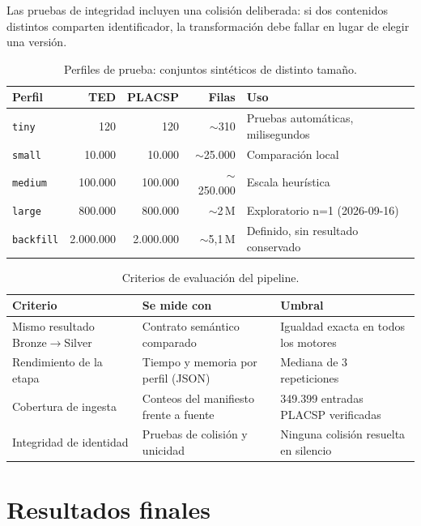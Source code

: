 \documentclass[11pt,a4paper]{article}
\newcommand{\cabecera}[1]{{\bfseries #1}}
\newcommand{\tarrow}{$\rightarrow$}
\begin{document}
Las pruebas de integridad incluyen una colisión deliberada: si dos contenidos
distintos comparten identificador, la transformación debe fallar en lugar de
elegir una versión.

\begin{table}[H]
\centering
\small
\begin{tabularx}{\textwidth}{@{}l r r r X@{}}
\toprule
\cabecera{Perfil} & \cabecera{TED} & \cabecera{PLACSP} & \cabecera{Filas} & \cabecera{Uso}\\
\midrule
\texttt{tiny} & 120 & 120 & $\sim$310 & Pruebas automáticas, milisegundos\\
\texttt{small} & 10.000 & 10.000 & $\sim$25.000 & Comparación local\\
\texttt{medium} & 100.000 & 100.000 & $\sim$250.000 & Escala heurística\\
\texttt{large} & 800.000 & 800.000 & $\sim$2\,M & Exploratorio n=1 (2026-09-16)\\
\texttt{backfill} & 2.000.000 & 2.000.000 & $\sim$5{,}1\,M & Definido, sin resultado conservado\\
\bottomrule
\end{tabularx}
\caption{Perfiles de prueba: conjuntos sintéticos de distinto tamaño.}
\end{table}

\begin{table}[H]
\centering
\small
\begin{tabularx}{\textwidth}{@{}X l l@{}}
\toprule
\cabecera{Criterio} & \cabecera{Se mide con} & \cabecera{Umbral}\\
\midrule
Mismo resultado Bronze\tarrow Silver & Contrato semántico comparado & Igualdad exacta en todos los motores\\
Rendimiento de la etapa & Tiempo y memoria por perfil (JSON) & Mediana de 3 repeticiones\\
Cobertura de ingesta & Conteos del manifiesto frente a fuente & 349.399 entradas PLACSP verificadas\\
Integridad de identidad & Pruebas de colisión y unicidad & Ninguna colisión resuelta en silencio\\
\bottomrule
\end{tabularx}
\caption{Criterios de evaluación del pipeline.}
\end{table}

\clearpage
\section{Resultados finales}
\end{document}
